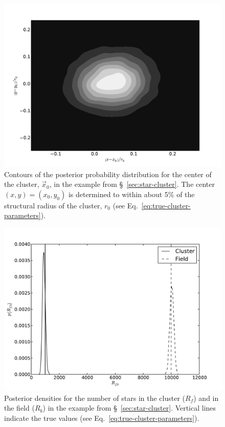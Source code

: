 \documentclass[aps,prd]{revtex4-1}
\begin{document}
\begin{figure}
  \includegraphics[width=\columnwidth]{sky_location}
  \caption{\label{fig:sky-loc} Contours of the posterior probability
    distribution for the center of the cluster, $\vec{x}_0$, in the
    example from \S~\ref{sec:star-cluster}.  The center $(x,y) =
    \left(x_0, y_0\right)$ is determined to within about 5\% of the
    structural radius of the cluster, $r_0$ (see
    Eq.~\eqref{eq:true-cluster-parameters}).}
\end{figure}

\begin{figure}
  \includegraphics[width=\columnwidth]{numbers}
  \caption{\label{fig:cluster-number} Posterior densities for the
    number of stars in the cluster ($R_f$) and in the field ($R_b$) in
    the example from \S~\ref{sec:star-cluster}.  Vertical lines
    indicate the true values (see
    Eq.~\eqref{eq:true-cluster-parameters}). }
\end{figure}
\end{document}
